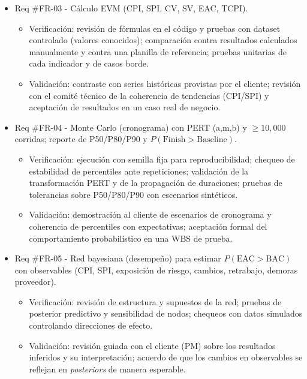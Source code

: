\documentclass[12pt]
{charter}
\begin{document}
\begin{itemize}

\item Req \#FR-03 - Cálculo EVM (CPI, SPI, CV, SV, EAC, TCPI).
  \begin{itemize}
    \item Verificación: revisión de fórmulas en el código y pruebas con dataset controlado (valores conocidos); comparación contra resultados calculados manualmente y contra una planilla de referencia; pruebas unitarias de cada indicador y de casos borde.
    \item Validación: contraste con series históricas provistas por el cliente; revisión con el comité técnico de la coherencia de tendencias (CPI/SPI) y aceptación de resultados en un caso real de negocio.
  \end{itemize}

\item Req \#FR-04 - Monte Carlo (cronograma) con PERT (a,m,b) y $\geq 10{,}000$ corridas; reporte de P50/P80/P90 y $P(\text{Finish}>\text{Baseline})$.
  \begin{itemize}
    \item Verificación: ejecución con semilla fija para reproducibilidad; chequeo de estabilidad de percentiles ante repeticiones; validación de la transformación PERT y de la propagación de duraciones; pruebas de tolerancias sobre P50/P80/P90 con escenarios sintéticos.
    \item Validación: demostración al cliente de escenarios de cronograma y coherencia de percentiles con expectativas; aceptación formal del comportamiento probabilístico en una WBS de prueba.
  \end{itemize}

\item Req \#FR-05 - Red bayesiana (desempeño) para estimar $P(\text{EAC}>\text{BAC})$ con observables (CPI, SPI, exposición de riesgo, cambios, retrabajo, demoras proveedor).
  \begin{itemize}
    \item Verificación: revisión de estructura y supuestos de la red; pruebas de posterior predictivo y sensibilidad de nodos; chequeos con datos simulados controlando direcciones de efecto.
    \item Validación: revisión guiada con el cliente (PM) sobre los resultados inferidos y su interpretación; acuerdo de que los cambios en observables se reflejan en \textit{posteriors} de manera esperable.
  \end{itemize}


\end{itemize}
\end{document}

